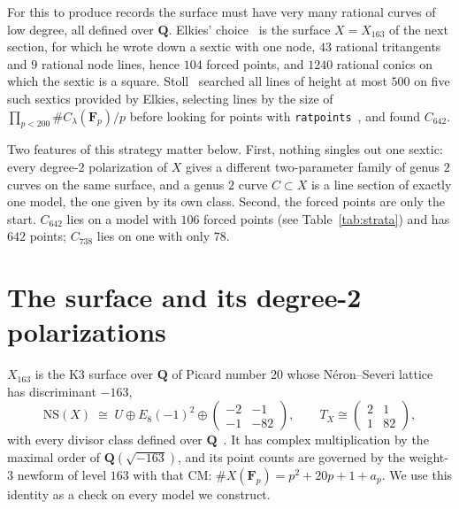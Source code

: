 \documentclass[11pt]{article}
\newcommand{\Q}{\mathbf{Q}}
\newcommand{\F}{\mathbf{F}}
\newcommand{\NS}{\mathrm{NS}}
\newcommand{\X}{X}
\theoremstyle{remark}
\begin{document}
For this to produce records the surface must have very many rational curves of low degree, all defined over $\Q$.  Elkies'
choice~\cite{ElkiesClay} is the surface $\X=\X_{163}$ of the next section, for which he wrote down a sextic with one node,
$43$ rational tritangents and $9$ rational node lines, hence $104$ forced points, and $1240$ rational
conics on which the sextic is a square.  Stoll~\cite{StollAvg} searched all lines of height at most $500$ on five such
sextics provided by Elkies, selecting lines by the size of $\prod_{p<200}\#C_\lambda(\F_p)/p$ before looking for points with
\texttt{ratpoints}~\cite{ratpoints}, and found $C_{642}$.

Two features of this strategy matter below.  First, nothing singles out one sextic: every degree-$2$ polarization of
$\X$ gives a different two-parameter family of genus $2$ curves on the same surface, and a genus $2$ curve
$C\subset\X$ is a line section of exactly one model, the one given by its own class.  Second, the forced points are only
the start.  $C_{642}$ lies on a model with $106$ forced points (see Table~\ref{tab:strata}) and has $642$ points;
$C_{738}$ lies on one with only $78$.

\section{The surface and its degree-2 polarizations}\label{sec:surface}

$\X_{163}$ is the K3 surface over $\Q$ of Picard number $20$ whose N\'eron--Severi lattice has discriminant $-163$,
\[
\NS(\X)\;\cong\;U\oplus E_8(-1)^2\oplus\begin{pmatrix}-2&-1\\-1&-82\end{pmatrix},\qquad
T_\X\cong\begin{pmatrix}2&1\\1&82\end{pmatrix},
\]
with every divisor class defined over $\Q$~\cite{ElkiesClay}.  It has complex multiplication by the maximal order of
$\Q(\sqrt{-163})$, and its point counts are governed by the weight-$3$ newform of level $163$ with that CM:
$\#\X(\F_p)=p^2+20p+1+a_p$.  We use this identity as a check on every model we construct.
\end{document}
